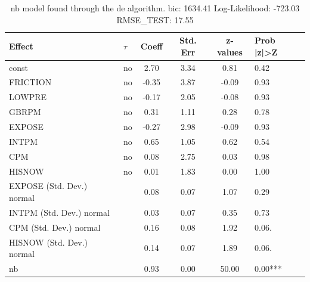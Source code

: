 \begin{table}
	\caption{nb model found through the de algorithm. bic: 1634.41 Log-Likelihood: -723.03 RMSE_TEST: 17.55}
	\begin{center}
		\begin{tabular}{|l|l|c|c|c|l|}
			\hline
			Effect & $\tau$ & Coeff & Std. Err & z-values & Prob |z|>Z \\
			\hline
			const & no & 2.70 & 3.34 & 0.81 & 0.42 \\
			\hline
			FRICTION & no & -0.35 & 3.87 & -0.09 & 0.93 \\
			\hline
			LOWPRE & no & -0.17 & 2.05 & -0.08 & 0.93 \\
			\hline
			GBRPM & no & 0.31 & 1.11 & 0.28 & 0.78 \\
			\hline
			EXPOSE & no & -0.27 & 2.98 & -0.09 & 0.93 \\
			\hline
			INTPM & no & 0.65 & 1.05 & 0.62 & 0.54 \\
			\hline
			CPM & no & 0.08 & 2.75 & 0.03 & 0.98 \\
			\hline
			HISNOW & no & 0.01 & 1.83 & 0.00 & 1.00 \\
			\hline
			EXPOSE (Std. Dev.) normal &  & 0.08 & 0.07 & 1.07 & 0.29 \\
			\hline
			INTPM (Std. Dev.) normal &  & 0.03 & 0.07 & 0.35 & 0.73 \\
			\hline
			CPM (Std. Dev.) normal &  & 0.16 & 0.08 & 1.92 & 0.06. \\
			\hline
			HISNOW (Std. Dev.) normal &  & 0.14 & 0.07 & 1.89 & 0.06. \\
			\hline
			nb &  & 0.93 & 0.00 & 50.00 & 0.00*** \\
			\hline
		\end{tabular}
	\end{center}
\end{table}